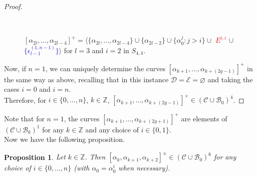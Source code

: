 \documentclass[twoside,11pt,a4paper]{article}
\newtheorem{Prop}[Def]{Proposition}
\newcommand*{\Cf}{\mathscr{C}}
\newcommand*{\Bf}{\mathscr{B}}
\newcommand*{\Df}{\mathscr{D}}
\newcommand*{\Ef}{\mathscr{E}}
\newcommand*{\epsp}[3]{\epsilon_{#1}^{(#2,#3)}}
\begin{document}
\begin{proof}
\begin{figure}[h]
 \begin{center}
  \resizebox{10cm}{!}{} \\[0.3cm]
  \resizebox{10cm}{!}{} \caption{$[\alpha_{2l}, \ldots, \alpha_{2l-4}]^{+} = \langle \{\alpha_{2l}, \ldots, \alpha_{2l-4}\} \cup \{\alpha_{2l-2}\} \cup \{\alpha_{0}^{j}: j > i\} \cup$ \textcolor{red}{$E^{i,i}$} $\cup$ \textcolor{blue}{$\{\epsp{l-1}{1}{n-1}\}$}$\rangle$ for $l = 3$ and $i = 2$ in $S_{4,4}$.} \label{Translemaprop2fig3}
 \end{center}
\end{figure}
\indent Now, if $n = 1$, we can uniquely determine the curves $[\alpha_{k+1}, \ldots, \alpha_{k+(2g-1)}]^{+}$ in the same way as above, recalling that in this instance $\Df = \Ef = \varnothing$ and taking the cases $i = 0$ and $i = n$.\\
\indent Therefore, for $i \in \{0, \ldots, n\}$, $k \in \mathbb{Z}$, $[\alpha_{k+1}, \ldots, \alpha_{k+(2g-1)}]^{+} \in (\Cf \cup \Bf_{0})^{4}$.
\end{proof}
\indent Note that for $n = 1$, the curves $[\alpha_{k + 1}, \ldots, \alpha_{k + (2g+1)}]^{+}$ are elements of $(\Cf \cup \Bf_{0})^{1}$ for any $k \in \mathbb{Z}$ and any choice of $i \in \{0,1\}$.\\
\indent Now we have the following proposition.
\begin{Prop}\label{translemaprop1}
 Let $k \in \mathbb{Z}$. Then $[\alpha_{k}, \alpha_{k+1}, \alpha_{k+2}]^{\pm} \in (\Cf \cup \Bf_{0})^{6}$ for any choice of $i \in \{0, \ldots, n\}$ (with $\alpha_{0} = \alpha_{0}^{i}$ when necessary).
\end{Prop}
\end{document}
